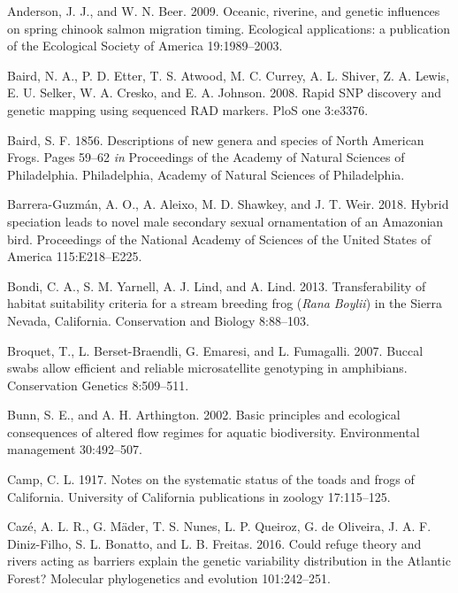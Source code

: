 \documentclass[proquest,12pt,final]{ucthesis-CA2012} %
\begin{document}
\begin{ucmainmatter}
\leavevmode\hypertarget{ref-anderson_oceanic_2009}{}%
Anderson, J. J., and W. N. Beer. 2009. Oceanic, riverine, and genetic
influences on spring chinook salmon migration timing. Ecological
applications: a publication of the Ecological Society of America
19:1989--2003.

\leavevmode\hypertarget{ref-baird_rapid_2008}{}%
Baird, N. A., P. D. Etter, T. S. Atwood, M. C. Currey, A. L. Shiver, Z.
A. Lewis, E. U. Selker, W. A. Cresko, and E. A. Johnson. 2008. Rapid SNP
discovery and genetic mapping using sequenced RAD markers. PloS one
3:e3376.

\leavevmode\hypertarget{ref-baird_descriptions_1856}{}%
Baird, S. F. 1856. Descriptions of new genera and species of North
American Frogs. Pages 59--62 \emph{in} Proceedings of the Academy of
Natural Sciences of Philadelphia. Philadelphia, Academy of Natural
Sciences of Philadelphia.

\leavevmode\hypertarget{ref-barrera-guzman_hybrid_2018}{}%
Barrera-Guzmán, A. O., A. Aleixo, M. D. Shawkey, and J. T. Weir. 2018.
Hybrid speciation leads to novel male secondary sexual ornamentation of
an Amazonian bird. Proceedings of the National Academy of Sciences of
the United States of America 115:E218--E225.

\leavevmode\hypertarget{ref-bondi_transferability_2013}{}%
Bondi, C. A., S. M. Yarnell, A. J. Lind, and A. Lind. 2013.
Transferability of habitat suitability criteria for a stream breeding
frog (\emph{Rana} \emph{Boylii}) in the Sierra Nevada, California.
Conservation and Biology 8:88--103.

\leavevmode\hypertarget{ref-broquet_buccal_2007}{}%
Broquet, T., L. Berset-Braendli, G. Emaresi, and L. Fumagalli. 2007.
Buccal swabs allow efficient and reliable microsatellite genotyping in
amphibians. Conservation Genetics 8:509--511.

\leavevmode\hypertarget{ref-bunn_basic_2002}{}%
Bunn, S. E., and A. H. Arthington. 2002. Basic principles and ecological
consequences of altered flow regimes for aquatic biodiversity.
Environmental management 30:492--507.

\leavevmode\hypertarget{ref-camp_notes_1917}{}%
Camp, C. L. 1917. Notes on the systematic status of the toads and frogs
of California. University of California publications in zoology
17:115--125.

\leavevmode\hypertarget{ref-caze_could_2016}{}%
Cazé, A. L. R., G. Mäder, T. S. Nunes, L. P. Queiroz, G. de Oliveira, J.
A. F. Diniz-Filho, S. L. Bonatto, and L. B. Freitas. 2016. Could refuge
theory and rivers acting as barriers explain the genetic variability
distribution in the Atlantic Forest? Molecular phylogenetics and
evolution 101:242--251.


\end{ucmainmatter}
\end{document}
